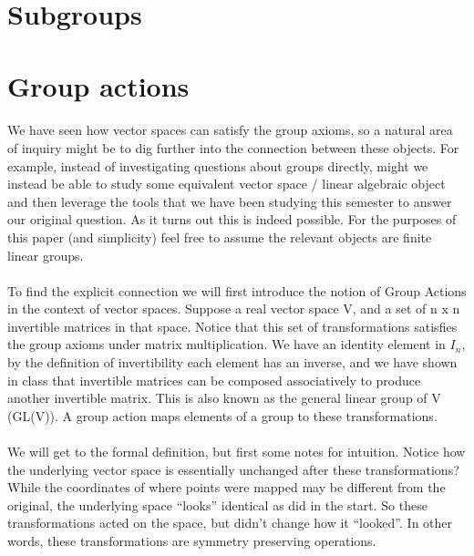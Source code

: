 \documentclass{article}
\begin{document}
\section{Subgroups}

\section{Group actions}
\paragraph*{} We have seen how vector spaces can satisfy the group axioms, so a 
natural area of inquiry might be to dig further into the connection between these
 objects. For example, instead of investigating questions about groups directly, 
 might we instead be able to study some equivalent vector space / linear algebraic 
 object and then leverage the tools that we have been studying this semester to
answer our original question. As it turns out this is indeed possible. For the 
purposes of this paper (and simplicity) feel free to assume the relevant objects 
are finite linear groups. 
\paragraph*{} To find the explicit connection we will first introduce the notion
 of Group Actions in the context of vector spaces. Suppose a real vector space V,
  and a set of n x n invertible matrices in that space. Notice that this set of
  transformations satisfies the group axioms under matrix multiplication. We have
 an identity element in $I_n$, by the definition of invertibility each element
  has an inverse, and we have shown in class that invertible matrices can be 
  composed associatively to produce another invertible matrix. This is also known 
  as the general linear group of V (GL(V)). A group action maps elements of a 
  group to these transformations.  
\paragraph*{} We will get to the formal definition, but first some notes for
intuition. Notice how the underlying vector space is essentially unchanged after 
these transformations? While the coordinates of where points were mapped may be 
different from the original, the underlying space “looks” identical as did in 
the start. So these transformations acted on the space, but didn't change how it 
“looked”. In other words, these transformations are symmetry preserving operations. 
\end{document}
